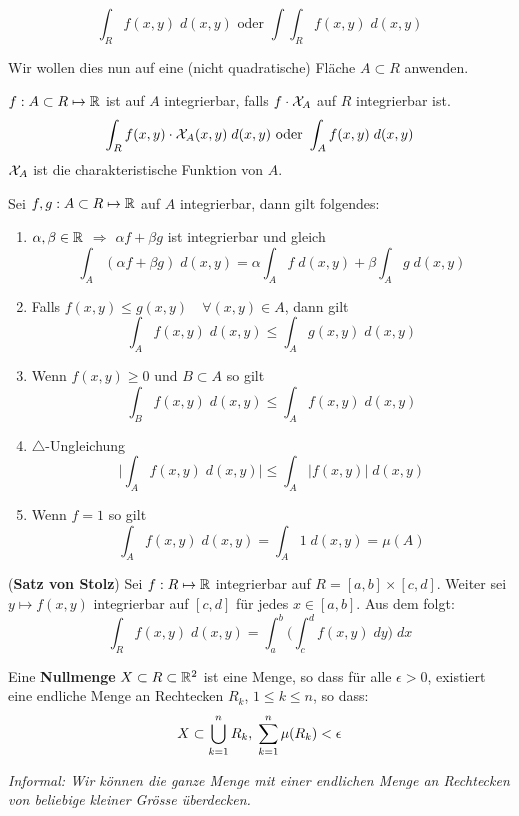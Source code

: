 $$\int_R f(x,y) \; d(x,y) \text{ oder } \int\int_R f(x,y) \; d(x,y)$$

Wir wollen dies nun auf eine (nicht quadratische) Fläche $A \subset R$ anwenden.

\begin{tcolorbox}
    $f: A \subset R \mapsto \mathbb{R}$ ist auf $A$ integrierbar, falls $f \cdot \mathcal{X}_A$ auf $R$ integrierbar ist.
    $$\int_R f(x,y) \cdot \mathcal{X}_A(x,y) \; d(x,y) \text{ oder } \int_A f(x,y) \; d(x,y)$$
    $\mathcal{X}_A$ ist die charakteristische Funktion von $A$.
\end{tcolorbox}

Sei $f,g : A \subset R \mapsto \mathbb{R}$ auf $A$ integrierbar, dann gilt folgendes:
\begin{enumerate}[label=(\arabic*)]
    \item $\alpha, \beta \in \mathbb{R}$ $\Rightarrow$ $\alpha f + \beta g$ ist integrierbar und gleich
    $$\int_A (\alpha f + \beta g) \; d(x,y) = \alpha \int_A f \; d(x,y) + \beta \int_A g \; d(x,y)$$
    \item Falls $f(x,y) \leq g(x,y) \quad \forall (x,y) \in A$, dann gilt
    $$\int_A f(x,y) \; d(x,y) \leq \int_A g(x,y) \; d(x,y)$$
    \item Wenn $f(x,y) \geq 0$ und $B \subset A$ so gilt
    $$\int_B f(x,y) \; d(x,y) \leq \int_A f(x,y) \; d(x,y)$$
    \item $\triangle$-Ungleichung
    $$\Big |  \int_A f(x,y) \; d(x,y)  \Big | \leq \int_A | f(x,y) | \; d(x,y)$$
    \item Wenn $f = 1$ so gilt
    $$\int_A f(x,y) \; d(x,y) = \int_A 1 \; d(x,y) = \mu(A)$$
\end{enumerate}

(\textbf{Satz von Stolz}) Sei $f: R \mapsto \mathbb{R}$ integrierbar auf $R = [a,b] \times [c,d]$. 
Weiter sei $y \mapsto f(x,y)$ integrierbar auf $[c,d]$ für jedes $x \in [a,b]$. Aus dem folgt:
$$\int_R f(x,y) \; d(x,y) = \int_a^b \Big(\int_c^d f(x,y) \; dy \Big) \; dx$$

\begin{tcolorbox}
    Eine \textbf{Nullmenge} $X \subset R \subset \mathbb{R}^2$ ist eine Menge, so dass für alle $\epsilon > 0$, existiert
    eine endliche Menge an Rechtecken $R_k$, $1 \leq k \leq n$, so dass:
    $$X \subset \bigcup_{k = 1}^n R_k, \; \sum\limits_{k = 1}^n \mu (R_k) < \epsilon$$
\end{tcolorbox}

\textit{Informal: Wir können die ganze Menge mit einer endlichen Menge an Rechtecken von beliebige kleiner 
Grösse überdecken.} \smallskip

